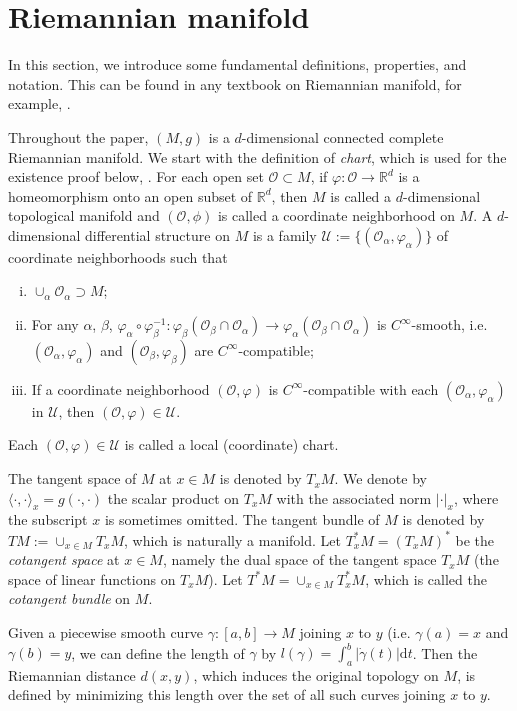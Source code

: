 \documentclass[a4paper]{article}
\numberwithin{equation}{section}
\theoremstyle{definition}
\begin{document}
\section{Riemannian manifold}\label{se_Riemannian_manifold}
In this section, we introduce some fundamental deﬁnitions, properties, and notation. This can be found in any textbook on Riemannian manifold, for example, \cite{L2003,W2014MR3154951}.
\par
Throughout the paper, $(M,g)$ is a $d$-dimensional connected complete Riemannian manifold. We start with the definition of \textit{chart}, which is used for the existence proof below, .
For each open set $\mathcal{O} \subset M$, if $\varphi:\mathcal{O}\to \mathbb{R}^d$ is a homeomorphism onto an open subset of $\mathbb{R}^d$, then $M$ is called a $d$-dimensional topological manifold and $(\mathcal{O},\phi)$ is called a coordinate neighborhood on $M$. A $d$-dimensional differential structure on $M$ is a family $\mathcal{U}:= \{ (\mathcal{O}_\alpha, \varphi_\alpha) \}$ of coordinate neighborhoods such that
\begin{enumerate}[(i)]
	\item $\cup_\alpha\mathcal{O}_\alpha \supset M$;
	\item For any $\alpha$, $\beta$, $\varphi_\alpha \circ \varphi^{-1}_\beta:\varphi_\beta (\mathcal{O}_\beta \cap \mathcal{O}_\alpha)\to \varphi_\alpha (\mathcal{O}_\beta \cap \mathcal{O}_\alpha )$ is $C^\infty$-smooth, i.e. $(\mathcal{O}_\alpha,\varphi_\alpha)$ and $(\mathcal{O}_\beta,\varphi_\beta)$ are $C^\infty$-compatible;
	\item If a coordinate neighborhood $(\mathcal{O},\varphi)$ is $C^\infty$-compatible with each $(\mathcal{O}_\alpha,\varphi_\alpha)$ in $\mathcal{U}$, then $(\mathcal{O},\varphi)\in \mathcal{U}$.
\end{enumerate}
Each $(\mathcal{O},\varphi)\in \mathcal{U}$ is called a local (coordinate) chart. 
\par
The tangent space of $M$ at $x\in M$ is denoted by $T_xM$. We denote by $\langle \cdot,\cdot\rangle_x=g(\cdot,\cdot)$ the scalar product on $T_xM$ with the associated norm $|\cdot|_x$, where the subscript $x$ is sometimes omitted. The tangent bundle of $M$ is denoted by $TM:=\cup_{x\in M}T_xM$, which is naturally a manifold. Let $T^*_xM=(T_xM)^*$ be the \textit{cotangent space} at $x\in M$, namely the dual space of the tangent space $T_xM$ (the space of linear functions on $T_xM$).
Let $T^*M=\cup_{x\in M}T^*_xM$, which is called the \textit{cotangent bundle} on $M$.
\par 
Given a piecewise smooth curve $\gamma:[a, b] \to M$ joining $x$ to $y $ (i.e. $\gamma (a) = x$ and $\gamma(b)=y$, we can define the length of $\gamma$ by $l(\gamma) = \int^b_a |\dot{\gamma}(t)|\mathrm{d}t$. Then the Riemannian distance $d(x,y)$, which induces the original topology on $M$, is defined by minimizing this length over the set of all such curves joining $x$ to $y$.
\end{document}
